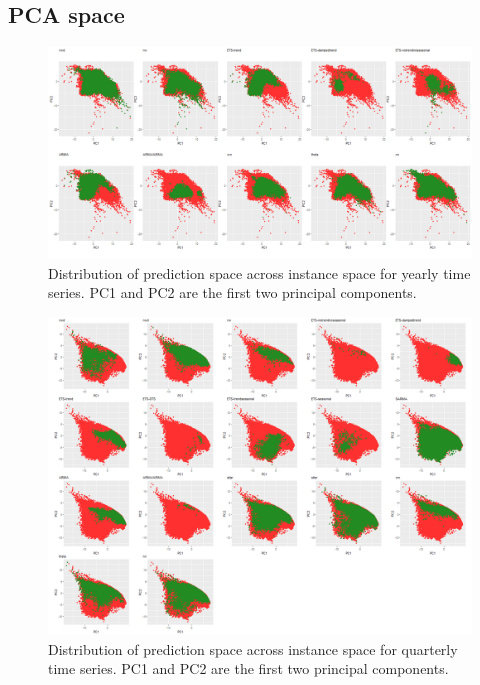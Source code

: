 \documentclass[11pt,a4paper,]{article}
\theoremstyle{definition}
\theoremstyle{definition}
\theoremstyle{definition}
\theoremstyle{remark}
\begin{document}
\subsection*{PCA space}\label{pca-space}

\begin{figure}[h]

{\centering \includegraphics{figures/yearlypca-1} 

}

\caption{Distribution of prediction space across instance space for yearly time series. PC1 and PC2 are the first two principal components.}\label{fig:yearlypca}
\end{figure}

\clearpage

\begin{figure}
\centering
\includegraphics{figures/quarterlypca-1.png}
\caption{\label{fig:quarterlypca}Distribution of prediction space across
instance space for quarterly time series. PC1 and PC2 are the first two
principal components.}
\end{figure}
\end{document}
